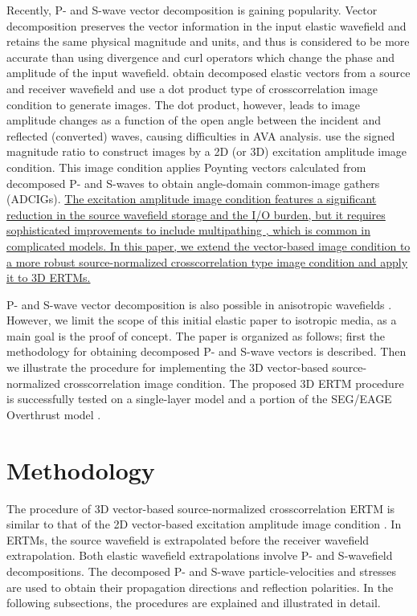 \documentclass[manuscript,ulem,graphix,revised]{geophysics}
\begin{document}
Recently, P- and S-wave vector decomposition \citep{ma03,zhang07,wenlong_cmp15,wenlong_pv16,zhu17,wenlong17} is gaining popularity. Vector decomposition preserves the vector information in the input elastic wavefield and retains the same physical magnitude and units, and thus is considered to be more accurate than using divergence and curl operators which change the phase and amplitude of the input wavefield. \citet{wang_cl16} obtain decomposed elastic vectors from a source and receiver wavefield and use a dot product type of crosscorrelation image condition to generate images. The dot product, however, leads to image amplitude changes as a function of the open angle between the incident and reflected (converted) waves, causing difficulties in AVA analysis. \citet{wenlong_vct15,wenlong_3d16} use the signed magnitude ratio to construct images by a 2D (or 3D) excitation amplitude image condition. 
This image condition applies Poynting vectors \citep{cerveny01} calculated from decomposed P- and S-waves to obtain angle-domain common-image gathers (ADCIGs). \marginnote{[4]}\uline{The excitation amplitude image condition \mbox{\citep{wenlong_vct15}} features a significant reduction in the source wavefield storage and the I/O burden, but it requires sophisticated improvements to include multipathing \mbox{\citep{jin15}}, which is common in complicated models. In this paper, we extend the vector-based image condition to a more robust source-normalized crosscorrelation type image condition and apply it to 3D ERTMs.}

P- and S-wave vector decomposition is also possible in anisotropic wavefields \citep{cheng14,wenlong17}. However, we limit the scope of this initial elastic paper to isotropic media, as a main goal is the proof of concept. The paper is organized as follows; first the methodology for obtaining decomposed P- and S-wave vectors is described. Then we illustrate the procedure for implementing the 3D vector-based source-normalized crosscorrelation image condition.
The proposed 3D ERTM procedure is successfully tested on a single-layer model and a portion of the SEG/EAGE Overthrust model \citep{aminzadeh94}. 

\section{Methodology}

The procedure of 3D vector-based source-normalized crosscorrelation ERTM is similar to that of the 2D vector-based excitation amplitude image condition \citep{wenlong_vct15}. In ERTMs, the source wavefield is extrapolated before the receiver wavefield extrapolation. Both elastic wavefield extrapolations involve P- and S-wavefield decompositions. The decomposed P- and S-wave particle-velocities and stresses are used to obtain their propagation directions and reflection polarities. 
In the following subsections, the procedures are explained and illustrated in detail.
\end{document}
